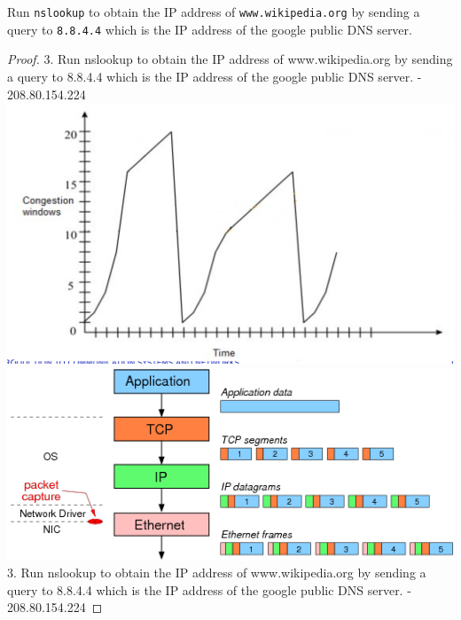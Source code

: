 \documentclass[../../main.tex]{subfiles}
\begin{document}
\begin{wts}
Run \lstinline{nslookup} to obtain the IP address of \lstinline{www.wikipedia.org} by sending a query to \lstinline{8.8.4.4} which is the IP address of the google public DNS server.   
\end{wts}
\begin{proof}
3. Run nslookup to obtain the IP address of www.wikipedia.org by sending a query to 8.8.4.4 which is the IP address of the google public DNS server.
- 208.80.154.224\\
\includegraphics[width=\textwidth]{subfiles/images/part3_q19_window_graphic.png}
\includegraphics[width=\textwidth]{subfiles/images/L5_Manual/L5N2_ DNS & HTTP_PAGE24_13_Image153.png}
3. Run nslookup to obtain the IP address of www.wikipedia.org by sending a query to 8.8.4.4 which is the IP address of the google public DNS server.
- 208.80.154.224
\end{proof}
\end{document}
